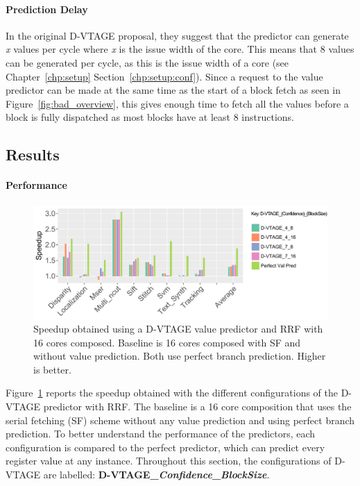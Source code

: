 \paragraph*{Prediction Delay}
In the original D-VTAGE proposal, they suggest that the predictor can generate \textit{x} values per cycle where \textit{x} is the issue width of the core.
This means that 8 values can be generated per cycle, as this is the issue width of a core (see Chapter~\ref{chp:setup} Section~\ref{chp:setup:conf}).
Since a request to the value predictor can be made at the same time as the start of a block fetch as seen in Figure~\ref{fig:bad_overview}, this gives enough time to fetch all the values before a block is fully dispatched as most blocks have at least 8 instructions.


\subsection{Results}

\paragraph*{Performance}

\begin{figure}[t]
    \centering
    \includegraphics[width=1\textwidth]{chapter3/graphics/vtage_speed3.pdf}
    \caption{Speedup obtained using a D-VTAGE value predictor and RRF with 16 cores composed. Baseline is 16 cores composed with SF and without value prediction. Both use perfect branch prediction. Higher is better.}
    \label{fig:vtage_perf}
	\vspace{1em}
\end{figure}

Figure~\ref{fig:vtage_perf} reports the speedup obtained with the different configurations of the D-VTAGE predictor with RRF.
The baseline is a 16 core composition that uses the serial fetching (SF) scheme without any value prediction and using perfect branch prediction.
To better understand the performance of the predictors, each configuration is compared to the perfect predictor, which can predict every register value at any instance.
Throughout this section, the configurations of D-VTAGE are labelled: \textbf{D-VTAGE\_\textit{Confidence}\_\textit{BlockSize}}.

